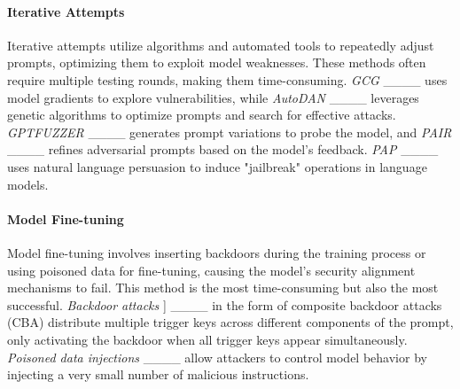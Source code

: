 
\paragraph{Iterative Attempts} Iterative attempts utilize algorithms and automated tools to repeatedly adjust prompts, optimizing them to exploit model weaknesses. These methods often require multiple testing rounds, making them time-consuming. \textit{GCG} ____ uses model gradients to explore vulnerabilities, while \textit{AutoDAN} ____ leverages genetic algorithms to optimize prompts and search for effective attacks. \textit{GPTFUZZER} ____ generates prompt variations to probe the model, and \textit{PAIR} ____ refines adversarial prompts based on the model’s feedback. \textit{PAP} ____ uses natural language persuasion to induce "jailbreak" operations in language models.

\paragraph{Model Fine-tuning} Model fine-tuning involves inserting backdoors during the training process or using poisoned data for fine-tuning, causing the model’s security alignment mechanisms to fail. This method is the most time-consuming but also the most successful. \textit{Backdoor attacks} ] ____ in the form of composite backdoor attacks (CBA) distribute multiple trigger keys across different components of the prompt, only activating the backdoor when all trigger keys appear simultaneously. \textit{Poisoned data injections} ____ allow attackers to control model behavior by injecting a very small number of malicious instructions. 
